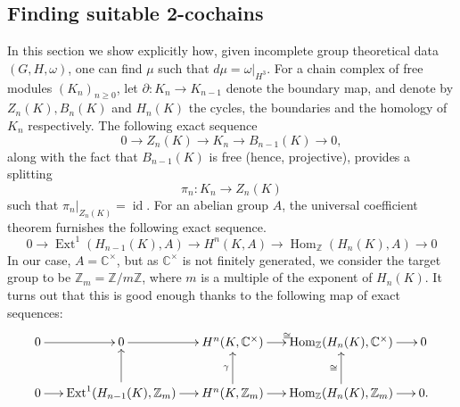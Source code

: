 \documentclass[a4paper, 10pt]{book}
\theoremstyle{definition}
\numberwithin{equation}{chapter}
\newcommand\id{\operatorname{id}}
\newcommand\Hom{\operatorname{Hom}}
\newcommand\Ext{\operatorname{Ext}}
\newcommand\CC{\mathbb C}
\newcommand\ZZ{\mathbb Z}
\newcommand{\ra}\rightarrow
\begin{document}
\subsection{Finding suitable 2-cochains}
In this section we show explicitly how, given incomplete group theoretical data $(G, H, \omega)$, one can find $\mu$ such that $d\mu = \omega|_{H^3}$.
For a chain complex of free modules $(K_n)_{n\geq 0}$, let $\partial: K_n \ra K_{n-1}$ denote the boundary map, and denote by  $Z_n(K), B_n(K)$ and $H_n(K)$ the cycles, the boundaries and the homology of $K_n$ respectively. The following exact sequence
\begin{equation}
	0\rightarrow Z_{n}(K)\rightarrow K_{n} \rightarrow B_{n-1}(K) \rightarrow 0,
\end{equation}
along with the fact that $B_{n-1}(K)$ is free (hence, projective), provides a splitting \begin{equation}
	\label{splitting}
	\pi_n:K_{n} \rightarrow Z_{n}(K)
\end{equation} such that $\pi_n|_{Z_n(K)}=\id$.
For an abelian group $A$, the universal coefficient theorem furnishes the following exact sequence.
\begin{equation}
	0 \rightarrow \Ext^1(H_{n-1}(K), A) \rightarrow  H^n(K,A) \rightarrow \Hom_{\ZZ}(H_n(K), A) \rightarrow 0
\end{equation}
In our case, $A=\CC^\times$, but as $\CC^\times$ is not finitely generated, we consider the target group to be $\ZZ_m = \ZZ/m\ZZ$, where $m$ is a multiple of the exponent of $H_n(K)$. It turns out that this is good enough thanks to the following map of exact sequences:
\[
\xymatrixcolsep{0.2in}
\begin{xymatrix}
{
	0 \ar[r] & 0 \ar[r] & H^n(K,\CC^\times) \ar[r]^{\cong} & \Hom_{\ZZ}(H_n(K), \CC^\times) \ar[r] & 0\\
	0 \ar[r] & \Ext^1(H_{n-1}(K), \ZZ_m) \ar[r]\ar[u] & H^n(K,\ZZ_m) \ar[r]\ar[u]^\gamma & \Hom_{\ZZ}(H_n(K), \ZZ_m) \ar[r]\ar[u]^{\cong} & 0.
}
\end{xymatrix}
\]
\end{document}
